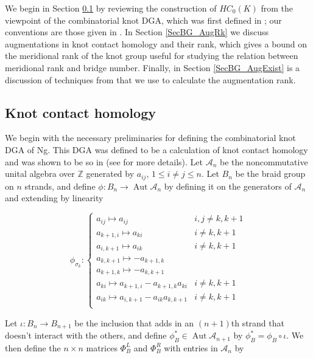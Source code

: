 \documentclass[11pt]{amsart}
\def\Z{{\mathbb Z}}
\def\A{{\mathcal A}}
\def\s{{\sigma}}
\newcommand\Aut{\operatorname{Aut}}
\begin{document}
  We begin in Section \ref{SecBG_KCHdef} by reviewing the construction of $HC_0(K)$ from the viewpoint of the combinatorial knot DGA, which was first defined in \cite{Ng08}; our conventions are those given in \cite{Ng12}. In Section \ref{SecBG_AugRk} we discuss augmentations in knot contact homology and their rank, which gives a bound on the meridional rank of the knot group useful for studying the relation between meridional rank and bridge number. Finally, in Section \ref{SecBG_AugExist} is a discussion of techniques from \cite{Cor13b} that we use to calculate the augmentation rank.

\subsection{Knot contact homology}
\label{SecBG_KCHdef}

  We begin with the necessary preliminaries for defining the combinatorial knot DGA of Ng. This DGA was defined to be a calculation of knot contact homology and was shown to be so in \cite{EENS12} (see \cite{Ng12} for more details). Let $\A_n$ be the noncommutative unital algebra over $\Z$ generated by $a_{ij}$, $1\le i\ne j\le n$.  Let $B_n$ be the braid group on $n$ strands, and define $\phi : B_n \rightarrow\Aut \A_n$ by defining it on the generators of $\A_n$ and extending by linearity

  $$
  \phi_{\s_k}\colon
  \left\{
       \begin{array}{lr}
         a_{ij}\mapsto a_{ij} & i,j\ne k,k+1\\
         a_{k+1,i}\mapsto a_{ki} & i\ne k,k+1\\
         a_{i,k+1}\mapsto a_{ik} & i\ne k,k+1\\
         a_{k,k+1}\mapsto -a_{k+1,k} & \\
         a_{k+1,k}\mapsto -a_{k,k+1} & \\
         a_{ki}\mapsto a_{k+1,i} - a_{k+1,k}a_{ki} & i\ne k,k+1\\
         a_{ik}\mapsto a_{i,k+1} - a_{ik}a_{k,k+1} & i\ne k,k+1\\
       \end{array}
  \right.
  $$

  Let $\iota\colon B_n \rightarrow B_{n+1}$ be the inclusion that adds in an $(n+1)$th strand that doesn't interact with the others, and define $\phi_B^*\in \Aut \A_{n+1}$ by $\phi_B^* = \phi_B\circ\iota$.  We then define the $n\times n$ matrices $\Phi_B^L$ and $\Phi_B^R$ with entries in $\A_n$ by
\end{document}
